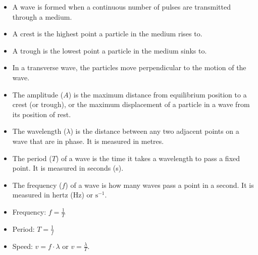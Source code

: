             \nopagebreak
      \label{m38806*id324089}\begin{itemize}[noitemsep] 
            \label{m38806*uid108}\item A wave is formed when a continuous number of pulses are transmitted through a medium.
\label{m38806*uid109}\item A crest is the highest point a particle in the medium rises to.
\label{m38806*uid110}\item A trough is the lowest point a particle in the medium sinks to.
\label{m38806*uid111}\item In a transverse wave, the particles move perpendicular to the motion of the wave.
\label{m38806*uid112}\item The amplitude ($A$) is the maximum distance from equilibrium position to a crest (or trough), or the maximum displacement of a particle in a wave from its position of rest.
\label{m38806*uid113}\item The wavelength ($\lambda $) is the distance between any two adjacent points on a wave that are in phase. It is measured in metres.
\label{m38806*uid114}\item The period ($T$) of a wave is the time it takes a wavelength to pass a fixed point. It is measured in seconds (s).
\label{m38806*uid115}\item The frequency ($f$) of a wave is how many waves pass a point in a second. It is measured in hertz (Hz) or $\text{s}{}^{-1}$.
\label{m38806*uid116}\item Frequency: $f=\frac{1}{T}$\label{m38806*uid117}\item Period: $T=\frac{1}{f}$\label{m38806*uid118}\item Speed: $v=f\cdot\lambda $ or $v=\frac{\lambda }{T}$.
\end{itemize}

